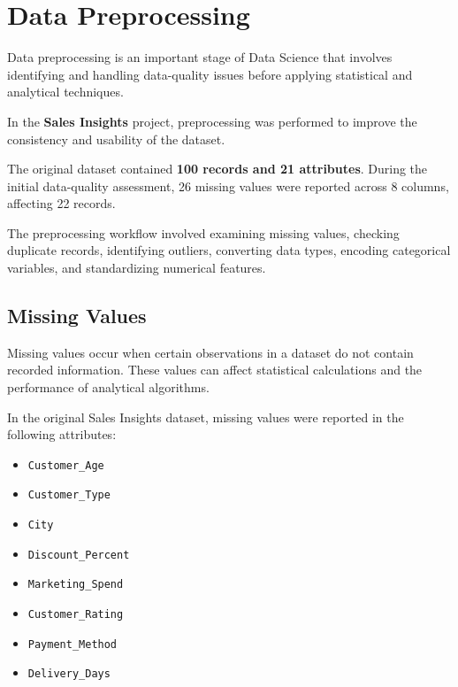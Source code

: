 \documentclass[12pt,a4paper]{report}
\begin{document}
\endgroup




\chapter{Data Preprocessing}

\begingroup
\fontsize{16}{23}\selectfont

Data preprocessing is an important stage of
Data Science that involves identifying and
handling data-quality issues before applying
statistical and analytical techniques.

In the \textbf{Sales Insights} project,
preprocessing was performed to improve
the consistency and usability of the dataset.

The original dataset contained
\textbf{100 records and 21 attributes}.
During the initial data-quality assessment,
26 missing values were reported across
8 columns, affecting 22 records.

The preprocessing workflow involved examining
missing values, checking duplicate records,
identifying outliers, converting data types,
encoding categorical variables, and
standardizing numerical features.


\section{Missing Values}

Missing values occur when certain observations
in a dataset do not contain recorded information.
These values can affect statistical calculations
and the performance of analytical algorithms.

In the original Sales Insights dataset,
missing values were reported in the
following attributes:

\begin{itemize}

    \item \texttt{Customer\_Age}
    \item \texttt{Customer\_Type}
    \item \texttt{City}
    \item \texttt{Discount\_Percent}
    \item \texttt{Marketing\_Spend}
    \item \texttt{Customer\_Rating}
    \item \texttt{Payment\_Method}
    \item \texttt{Delivery\_Days}

\end{itemize}
\end{document}
